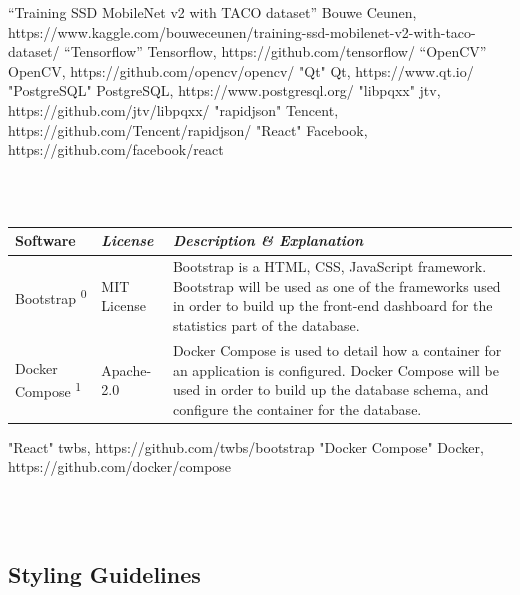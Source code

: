 \documentclass[conference]{IEEEtran}
\begin{document}
\begin{thebibliography}{00}
 “Training SSD MobileNet v2 with TACO dataset” Bouwe Ceunen, https://www.kaggle.com/bouweceunen/training-ssd-mobilenet-v2-with-taco-dataset/
 “Tensorflow” Tensorflow, https://github.com/tensorflow/
 “OpenCV” OpenCV, https://github.com/opencv/opencv/
 "Qt" Qt, https://www.qt.io/
 "PostgreSQL" PostgreSQL, https://www.postgresql.org/
 "libpqxx" jtv, https://github.com/jtv/libpqxx/
 "rapidjson" Tencent, https://github.com/Tencent/rapidjson/
 "React" Facebook, https://github.com/facebook/react
\end{thebibliography}~\\~\\

\begin{table}[htbp!]\normalsize
\begin{center}
\begin{tabular}{|p{1.5cm}|p{1.5cm}|p{4.7cm}|}
\hline
\textbf{Software} & \textbf{\textit{License}}& \textbf{\textit{Description \& Explanation}}\\
\hline
Bootstrap \textsuperscript{0} & MIT License &
Bootstrap is a HTML, CSS, JavaScript framework.\newline\newline
Bootstrap will be used as one of the frameworks used in order to build up the front-end dashboard for the statistics part of the database.
\\ \hline
Docker Compose \textsuperscript{1} & Apache-2.0 &
Docker Compose is used to detail how a container for an application is configured.\newline\newline
Docker Compose will be used in order to build up the database schema, and configure the container for the database.
\\ \hline
\end{tabular}
\label{tab1}
\end{center}
\end{table}

\begin{thebibliography}{00}
 "React" twbs, https://github.com/twbs/bootstrap
 "Docker Compose" Docker, https://github.com/docker/compose
\end{thebibliography}~\\~\\


\subsection{Styling Guidelines}
\end{document}
